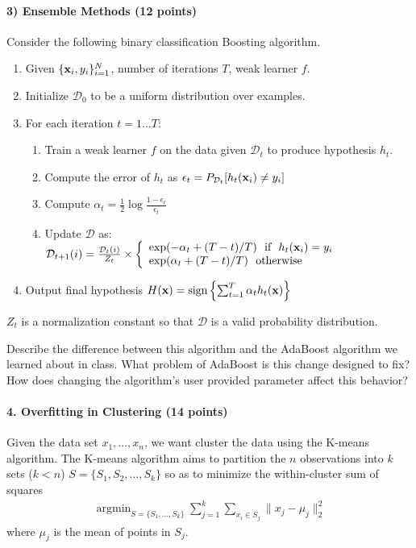 \documentclass{article}
\newcommand{\vx}{{\bf x}}
\newcommand{\vxi}{{\bf x}_i}
\newcommand{\yi}{y_i}
\newcommand{\D}{\mathcal{D}}
\begin{document}
\paragraph{3) Ensemble Methods (12 points)}

Consider the following binary classification Boosting algorithm.
\begin{enumerate}
	\item Given $\{\vxi, \yi\}_{i=1}^N$, number of iterations $T$, weak learner $f$.
	\item Initialize $\D_0$ to be a uniform distribution over examples.
	\item For each iteration $t = 1 \ldots T$:
		\begin{enumerate}
			\item Train a weak learner $f$ on the data given $\D_t$ to produce hypothesis $h_t$.
			\item Compute the error of $h_t$ as $\epsilon_t = P_{\D_t} [h_t(\vxi) \ne \yi]$
			\item Compute $\alpha_t = \frac{1}{2} \log \frac{1-\epsilon_t}{\epsilon_t}$
			\item Update $\D$ as:\\
				$\D_{t+1}(i) = \frac{\D_t(i)}{Z_t} \times \left\{
					\begin{array}{lr}
						\exp(-\alpha_t + (T-t) / T) ~~  \textrm{if} ~~ h_t(\vxi) = \yi  \\
						\exp(\alpha_t + (T-t) / T) ~~ \textrm{otherwise}
					\end{array}
					\right.$
			\end{enumerate}
		\item Output final hypothesis $H(\vx)=\textrm{sign} \left\{ \sum_{t=1}^T \alpha_t h_t(\vx) \right\}$
	\end{enumerate}

	$Z_t$ is a normalization constant so that $\D$ is a valid probability distribution.

	Describe the difference between this algorithm and the AdaBoost algorithm we learned about in class. What problem of AdaBoost is this change designed to fix? How does changing the algorithm's user provided parameter affect this behavior?

	\paragraph{4. Overfitting in Clustering (14 points)}

	Given the data set $x_1,...,x_n$, we want cluster the data using the K-means algorithm. The K-means algorithm aims to partition the $n$ observations into $k$ sets ($k < n$) $S = \{S_1, S_2, \ldots, S_k\}$ so as to minimize the within-cluster sum of squares
	\begin{eqnarray}
		\mathop{\textrm{argmin}}_{S=\{S_1,...,S_k\}}\sum_{j=1}^k\sum_{x_i\in S_j}\|x_j-\mu_j\|_2^2
		\label{objective1}
	\end{eqnarray}
	where $\mu_j$ is the mean of points in $S_j$.
\end{document}
